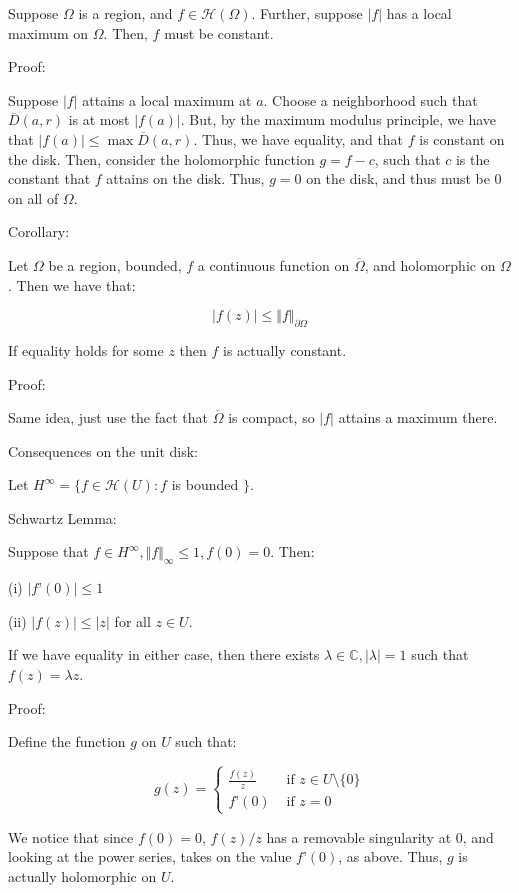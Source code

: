 \documentclass[10pt]{article}
\newcommand{\calH}{\mathcal{H}}
\begin{document}
Suppose $\Omega$ is a region, and $f \in \calH(\Omega)$. Further, suppose $|f|$ has a local maximum on $\Omega$. Then, $f$ must be constant.

Proof:

Suppose $|f|$ attains a local maximum at $a$. Choose a neighborhood such that $\overline{D}(a,r)$ is at most $|f(a)|$. But, by the maximum modulus principle, we have that $|f(a)| \leq \max \overline{D}(a,r)$. Thus, we have equality, and that $f$ is constant on the disk. Then, consider the holomorphic function $g = f - c$, such that $c$ is the constant that $f$ attains on the disk. Thus, $g= 0$ on the disk, and thus must be 0 on all of $\Omega$.

Corollary:

Let $\Omega$ be a region, bounded, $f$ a continuous function on $\overline{\Omega}$, and holomorphic on $\Omega$. Then we have that:

$$ |f(z)| \leq \Vert f \Vert_{\partial \Omega} $$

If equality holds for some $z$ then $f$ is actually constant.

Proof:

Same idea, just use the fact that $\overline{\Omega}$ is compact, so $|f|$ attains a maximum there.

Consequences on the unit disk:

Let $H^\infty = \{ f \in \calH(U) : f$ is bounded $\}$.

Schwartz Lemma:

Suppose that $f \in H^\infty, \Vert f \Vert_\infty \leq 1, f(0) = 0$. Then:

(i) $| f’(0)| \leq 1$

(ii) $ |f(z)| \leq |z| $ for all $z \in U$.

If we have equality in either case, then there exists $\lambda \in \mathbb{C}, |\lambda| = 1$ such that $f(z) = \lambda z$.

Proof:

Define the function $g$ on $U$ such that:

$$g(z) = \begin{cases} \frac{f(z)}{z} & \text{ if } z \in U \setminus \{ 0 \} \\ f’(0) & \text{ if } z= 0 \end{cases} $$

We notice that since $f(0) = 0$, $f(z) /z$ has a removable singularity at $0$, and looking at the power series, takes on the value $f’(0)$, as above. Thus, $g$ is actually holomorphic on $U$.
\end{document}
